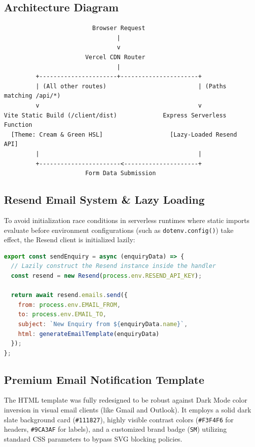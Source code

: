 \documentclass[11pt,a4paper]{article}
\begin{document}
\subsection{Architecture Diagram}
\begin{verbatim}
                         Browser Request
                                |
                                v
                       Vercel CDN Router
                                |
         +----------------------+----------------------+
         | (All other routes)                          | (Paths matching /api/*)
         v                                             v
Vite Static Build (/client/dist)             Express Serverless Function
  [Theme: Cream & Green HSL]                   [Lazy-Loaded Resend API]
         |                                             |
         +-----------------------<---------------------+
                       Form Data Submission
\end{verbatim}

\subsection{Resend Email System & Lazy Loading}
To avoid initialization race conditions in serverless runtimes where static imports evaluate before environment configurations (such as \texttt{dotenv.config()}) take effect, the Resend client is initialized lazily:

\begin{lstlisting}[language=JavaScript, caption=Lazy Initialization of Resend SDK]
export const sendEnquiry = async (enquiryData) => {
  // Lazily construct the Resend instance inside the handler
  const resend = new Resend(process.env.RESEND_API_KEY);
  
  return await resend.emails.send({
    from: process.env.EMAIL_FROM,
    to: process.env.EMAIL_TO,
    subject: `New Enquiry from ${enquiryData.name}`,
    html: generateEmailTemplate(enquiryData)
  });
};
\end{lstlisting}

\subsection{Premium Email Notification Template}
The HTML template was fully redesigned to be robust against Dark Mode color inversion in visual email clients (like Gmail and Outlook). It employs a solid dark slate background card (\texttt{\#111827}), highly visible contrast colors (\texttt{\#F3F4F6} for headers, \texttt{\#9CA3AF} for labels), and a customized brand badge (\texttt{SM}) utilizing standard CSS parameters to bypass SVG blocking policies.
\end{document}
